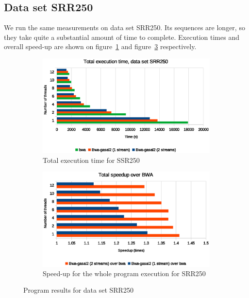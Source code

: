 \subsection{Data set SRR250}

We run the same measurements on data set SRR250. Its sequences are longer, so they take quite a substantial amount of time to complete. Execution times and overall speed-up are shown on figure~\ref{fig:total-exec-time-srr250} and figure~\ref{fig:total-exec-speed-up-srr250} respectively.


\begin{figure}[p]
	\centering
	\begin{subfigure}[t]{1\textwidth}
		\centering
		\includegraphics[width=1\textwidth]{srr250/total-exec-time-srr250}
		\caption{Total execution time for SSR250}
		\label{fig:total-exec-time-srr250}
	\end{subfigure}%
	
	\begin{subfigure}[b]{1\textwidth}
		\centering
		\includegraphics[width=1\textwidth]{srr250/total-exec-speed-up-srr250}
		\caption{Speed-up for the whole program execution for SRR250}
		\label{fig:total-exec-speed-up-srr250}
	\end{subfigure}
	\caption{Program results for data set SRR250}
\end{figure}

